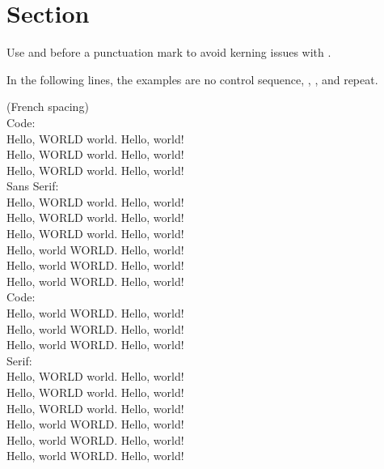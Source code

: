 \section{Section}

Use \texttt{\string\willstop} and \texttt{\string\wontstop}
before a punctuation mark
to avoid kerning issues with \texttt{\string\@}.

In the following lines, the examples are
no control sequence,
\texttt{\string\willstop},
\texttt{\string\wontstop},
and repeat.

\frenchspacing
(French spacing)\\
{\ttfamily
Code:\\
Hello, WORLD world. Hello, world!\\
Hello, WORLD world\willstop. Hello, world!\\
Hello, WORLD world\wontstop. Hello, world!\\
{\sffamily
Sans Serif:\\
Hello, WORLD world. Hello, world!\\
Hello, WORLD world\willstop. Hello, world!\\
Hello, WORLD world\wontstop. Hello, world!\\
Hello, world WORLD. Hello, world!\\
Hello, world WORLD\willstop. Hello, world!\\
Hello, world WORLD\wontstop. Hello, world!\\
}%
Code:\\
Hello, world WORLD. Hello, world!\\
Hello, world WORLD\willstop. Hello, world!\\
Hello, world WORLD\wontstop. Hello, world!\\
}%
Serif:\\
Hello, WORLD world. Hello, world!\\
Hello, WORLD world\willstop. Hello, world!\\
Hello, WORLD world\wontstop. Hello, world!\\
Hello, world WORLD. Hello, world!\\
Hello, world WORLD\willstop. Hello, world!\\
Hello, world WORLD\wontstop. Hello, world!

